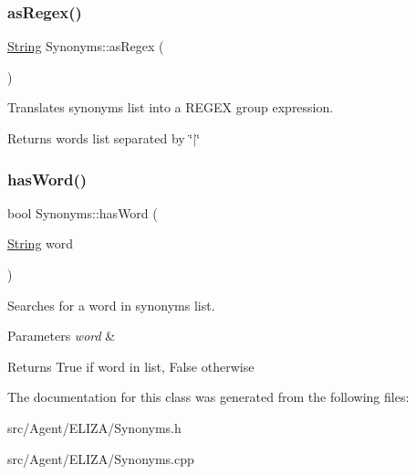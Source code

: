 \subsubsection{\texorpdfstring{as\+Regex()}{asRegex()}}
{\footnotesize\ttfamily \mbox{\hyperlink{classString}{String}} Synonyms\+::as\+Regex (\begin{DoxyParamCaption}{ }\end{DoxyParamCaption})}

Translates synonyms list into a R\+E\+G\+EX group expression. \begin{DoxyReturn}{Returns}
words list separated by \char`\"{}$\vert$\char`\"{} 
\end{DoxyReturn}
\mbox{\label{classSynonyms_a36ffe85c896f9293626deab7d6517b51}} 
\subsubsection{\texorpdfstring{has\+Word()}{hasWord()}}
{\footnotesize\ttfamily bool Synonyms\+::has\+Word (\begin{DoxyParamCaption}\item[{\mbox{\hyperlink{classString}{String}}}]{word }\end{DoxyParamCaption})}

Searches for a word in synonyms list. 
\begin{DoxyParams}{Parameters}
{\em word} & \\
\hline
\end{DoxyParams}
\begin{DoxyReturn}{Returns}
True if word in list, False otherwise 
\end{DoxyReturn}


The documentation for this class was generated from the following files\+:\begin{DoxyCompactItemize}
\item 
src/\+Agent/\+E\+L\+I\+Z\+A/Synonyms.\+h\item 
src/\+Agent/\+E\+L\+I\+Z\+A/Synonyms.\+cpp\end{DoxyCompactItemize}
